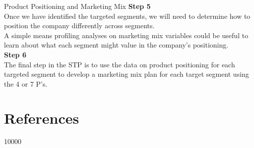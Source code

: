 \documentclass[pdf]{beamer}
\theoremstyle{remark}
\theoremstyle{definition}
\begin{document}
\begin{frame}[t]{Product Positioning and Marketing Mix}
\textbf{\color{calpolypomonagreen} Step 5} \\
\vspace{1.5ex}
Once we have identified the targeted segments, we will need to determine how to position the company differently across segments.  \\
\vspace{1.5ex}
A simple means profiling analyses on marketing mix variables could be useful to learn about what each segment might value in the company's positioning. \\
\vspace{1.5ex}
\textbf{\color{calpolypomonagreen} Step 6} \\
\vspace{1.5ex}
The final step in the STP is to use the data on product positioning for each targeted segment to develop a marketing mix plan for each target segment using the 4 or 7 P's.
\end{frame}

\section{References}

 10000
\small


\end{document}
